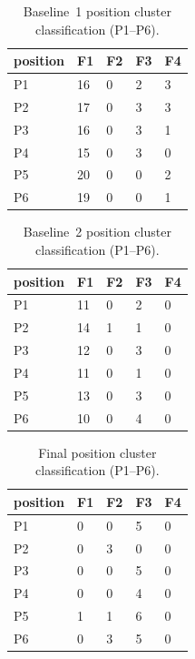 \documentclass[12pt, a4paper]{report}
\begin{document}
\begin{table}[htbp]
  \centering
  \caption{Baseline~1 position cluster classification (P1--P6).}
  \label{tab:baseline1_position_clusters}
  \begin{tabular}{lllll}
    \toprule
    position & F1 & F2 & F3 & F4 \\
    \midrule
    P1 & 16 & 0 & 2 & 3 \\
    P2 & 17 & 0 & 3 & 3 \\
    P3 & 16 & 0 & 3 & 1 \\
    P4 & 15 & 0 & 3 & 0 \\
    P5 & 20 & 0 & 0 & 2 \\
    P6 & 19 & 0 & 0 & 1 \\
    \bottomrule
  \end{tabular}
\end{table}

\begin{table}[htbp]
  \centering
  \caption{Baseline~2 position cluster classification (P1--P6).}
  \label{tab:baseline2_position_clusters}
  \begin{tabular}{lllll}
    \toprule
    position & F1 & F2 & F3 & F4 \\
    \midrule
    P1 & 11 & 0 & 2 & 0 \\
    P2 & 14 & 1 & 1 & 0 \\
    P3 & 12 & 0 & 3 & 0 \\
    P4 & 11 & 0 & 1 & 0 \\
    P5 & 13 & 0 & 3 & 0 \\
    P6 & 10 & 0 & 4 & 0 \\
    \bottomrule
  \end{tabular}
\end{table}

\begin{table}[htbp]
  \centering
  \caption{Final position cluster classification (P1--P6).}
  \label{tab:final_position_clusters}
  \begin{tabular}{lllll}
    \toprule
    position & F1 & F2 & F3 & F4 \\
    \midrule
    P1 & 0 & 0 & 5 & 0 \\
    P2 & 0 & 3 & 0 & 0 \\
    P3 & 0 & 0 & 5 & 0 \\
    P4 & 0 & 0 & 4 & 0 \\
    P5 & 1 & 1 & 6 & 0 \\
    P6 & 0 & 3 & 5 & 0 \\
    \bottomrule
  \end{tabular}
\end{table}
\end{document}
